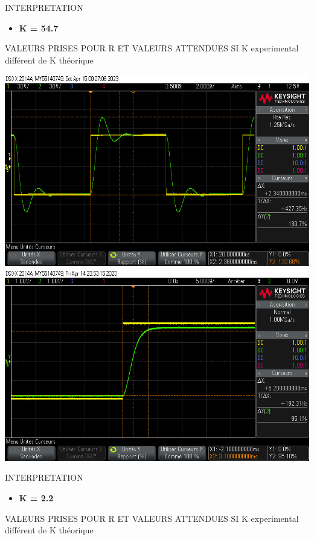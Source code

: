 \documentclass[12pt]{article}
\begin{document}
\large INTERPRETATION
\begin{itemize}
\item \bf \large K = 54.7
\end{itemize}
\large VALEURS PRISES POUR R ET VALEURS ATTENDUES SI K experimental différent de K théorique
\begin{center}
    \includegraphics[width = 18 cm]{TP3/Syst_1/P/14_04_2023_depk55.png}
    \includegraphics[width = 18 cm]{TP3/Syst_1/P/14_04_2023_tr_k5.png}
\end{center}
\large INTERPRETATION
\begin{itemize}
\item \bf \large K = 2.2
\end{itemize}
\large VALEURS PRISES POUR R ET VALEURS ATTENDUES SI K experimental différent de K théorique
\end{document}
